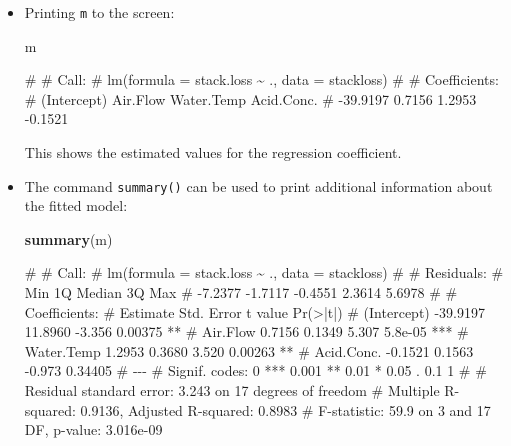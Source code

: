\documentclass[
  a4paper,
]{article}
\newenvironment{Shaded}{\begin{snugshade}}{\end{snugshade}}
\newcommand{\FunctionTok}[1]{\textcolor[rgb]{0.13,0.29,0.53}{\textbf{#1}}}
\newcommand{\NormalTok}[1]{#1}
\theoremstyle{definition}
\theoremstyle{definition}
\theoremstyle{definition}
\theoremstyle{definition}
\theoremstyle{remark}
\begin{document}
\begin{itemize}
\item
  Printing \texttt{m} to the screen:

\begin{Shaded}
\begin{Highlighting}[]
\NormalTok{  m}
\end{Highlighting}
\end{Shaded}

\begin{Shaded}
\begin{Highlighting}[]
\NormalTok{\# }
\NormalTok{\# Call:}
\NormalTok{\# lm(formula = stack.loss \textasciitilde{} ., data = stackloss)}
\NormalTok{\# }
\NormalTok{\# Coefficients:}
\NormalTok{\# (Intercept)     Air.Flow   Water.Temp   Acid.Conc.  }
\NormalTok{\#    {-}39.9197       0.7156       1.2953      {-}0.1521}
\end{Highlighting}
\end{Shaded}

  This shows the estimated values for the regression coefficient.
\item
  The command \texttt{summary()} can be used to print additional
  information about the fitted model:

\begin{Shaded}
\begin{Highlighting}[]
  \FunctionTok{summary}\NormalTok{(m)}
\end{Highlighting}
\end{Shaded}

\begin{Shaded}
\begin{Highlighting}[]
\NormalTok{\# }
\NormalTok{\# Call:}
\NormalTok{\# lm(formula = stack.loss \textasciitilde{} ., data = stackloss)}
\NormalTok{\# }
\NormalTok{\# Residuals:}
\NormalTok{\#     Min      1Q  Median      3Q     Max }
\NormalTok{\# {-}7.2377 {-}1.7117 {-}0.4551  2.3614  5.6978 }
\NormalTok{\# }
\NormalTok{\# Coefficients:}
\NormalTok{\#             Estimate Std. Error t value Pr(\textgreater{}|t|)    }
\NormalTok{\# (Intercept) {-}39.9197    11.8960  {-}3.356  0.00375 ** }
\NormalTok{\# Air.Flow      0.7156     0.1349   5.307  5.8e{-}05 ***}
\NormalTok{\# Water.Temp    1.2953     0.3680   3.520  0.00263 ** }
\NormalTok{\# Acid.Conc.   {-}0.1521     0.1563  {-}0.973  0.34405    }
\NormalTok{\# {-}{-}{-}}
\NormalTok{\# Signif. codes:  0 \textquotesingle{}***\textquotesingle{} 0.001 \textquotesingle{}**\textquotesingle{} 0.01 \textquotesingle{}*\textquotesingle{} 0.05 \textquotesingle{}.\textquotesingle{} 0.1 \textquotesingle{} \textquotesingle{} 1}
\NormalTok{\# }
\NormalTok{\# Residual standard error: 3.243 on 17 degrees of freedom}
\NormalTok{\# Multiple R{-}squared:  0.9136,  Adjusted R{-}squared:  0.8983 }
\NormalTok{\# F{-}statistic:  59.9 on 3 and 17 DF,  p{-}value: 3.016e{-}09}
\end{Highlighting}
\end{Shaded}


\end{itemize}
\end{document}
